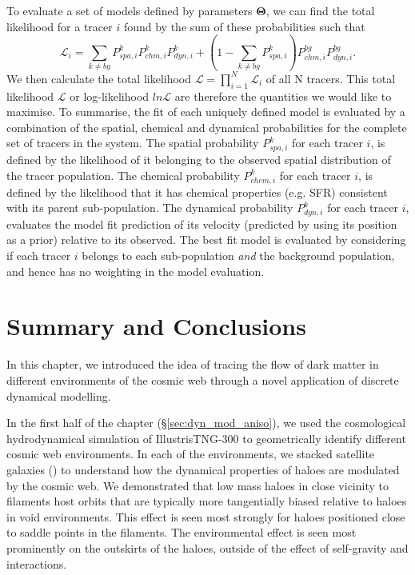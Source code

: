 To evaluate a set of models defined by parameters $\boldsymbol{\Theta}$, we can find the total likelihood for a tracer $i$ found by the sum of these probabilities such that
\begin{equation}
\mathcal{L}_i = \sum_{k \neq bg} P^{k}_{spa,i} P^{k}_{chm,i} P^{k}_{dyn,i} + \left(1 - \sum_{k \neq bg} P^{k}_{spa,i} \right) P^{bg}_{chm,i} P^{bg}_{dyn,i}.
\end{equation}
We then calculate the total likelihood $\mathcal{L} = \prod^N_{i=1} \mathcal{L}_i$ of all N tracers. This total likelihood $\mathcal{L}$ or log-likelihood $ln \mathcal{L}$ are therefore the quantities we would like to maximise. To summarise, the fit of each uniquely defined model is evaluated by a combination of the spatial, chemical and dynamical probabilities for the complete set of tracers in the system. The spatial probability $P^{k}_{spa,i}$ for each tracer $i$, is defined by the likelihood of it belonging to the observed spatial distribution of the tracer population. The chemical probability $P^{k}_{chem,i}$ for each tracer $i$, is defined by the likelihood that it has chemical properties (e.g. SFR) consistent with its parent sub-population. The dynamical probability $P^{k}_{dyn,i}$ for each tracer $i$, evaluates the model fit prediction of its velocity (predicted by using its position as a prior) relative to its observed. The best fit model is evaluated by considering if each tracer $i$ belongs to each sub-population \textit{and} the background population, and hence has no weighting in the model evaluation.

\section{Summary and Conclusions} \label{sec:dyn_mod_conclusions}
In this chapter, we introduced the idea of tracing the flow of dark matter in different environments of the cosmic web through a novel application of discrete dynamical modelling. 

In the first half of the chapter (\S\ref{sec:dyn_mod_aniso}), we used the cosmological hydrodynamical simulation of IllustrisTNG-300 to geometrically identify different cosmic web environments. In each of the environments, we stacked satellite galaxies () to understand how the dynamical properties of haloes are modulated by the cosmic web. We demonstrated that low mass haloes in close vicinity to filaments host orbits that are typically more tangentially biased relative to haloes in void environments. This effect is seen most strongly for haloes positioned close to saddle points in the filaments. The environmental effect is seen most prominently on the outskirts of the haloes, outside of the effect of self-gravity and interactions.

